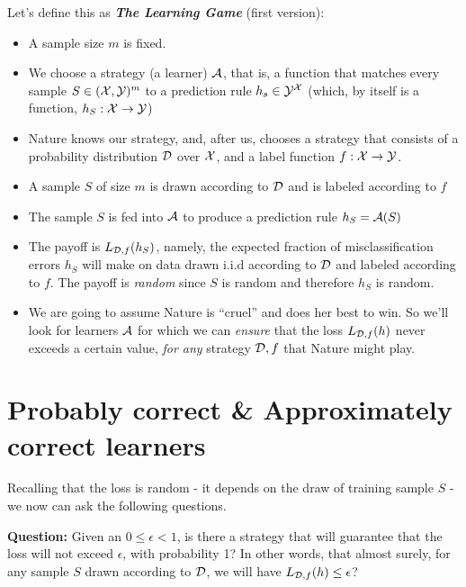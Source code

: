 {\vspace{3mm}
\begin{definition}
Let's define this as \textit{\textbf{ The Learning Game}} (first version):
\begin{itemize}
	\item A sample size $m$ is fixed.
	\item We choose a strategy (a learner) $\mathcal{A}$, that is, a function that matches every sample $S \in (\mathcal{X},\mathcal{Y})^m$ to a prediction rule $h_s \in \mathcal{Y} ^{\mathcal{X}}$ 
	(which, by itself is a function, $h_S:\mathcal{X}\to\mathcal{Y}$) 
	\item Nature knows our strategy, and, after us, chooses a strategy that consists of a probability distribution $\mathcal{D}$ over $\mathcal{X}$, and a label function $f:\mathcal{X}\to\mathcal{Y}$. 
	\item A sample $S$ of size $m$ is drawn according to $\mathcal{D}$ and is labeled
	according to $f$
	\item The sample $S$ is fed into $\mathcal{A}$ to produce a prediction rule
	$h_S=\mathcal{A}(S)$
	\item The payoff is $L_{\mathcal{D},f}(h_S)$, namely, the expected fraction of misclassification errors $h_S$ will make on data drawn i.i.d according to $\mathcal{D}$ and labeled according to $f$.
 The payoff is \textit{random} since $S$ is random and therefore $h_S$ is random.
	\item We are going to assume Nature is ``cruel'' and does her best to win.
	So we'll look for learners $\mathcal{A}$ for which we can \textit{ensure} that the loss $L_{\mathcal{D},f}(h)$ never exceeds a certain value, \textit{for any} strategy $\mathcal{D},f$ that Nature might play.
\end{itemize}
\end{definition}



\section{Probably correct \& Approximately correct learners}

Recalling that the loss is random - it depends on the draw of training sample
$S$ - we now can ask the following questions. 

\vspace{3mm}
{\bf Question:} Given an $0\leq\epsilon<1$, is there a strategy that will guarantee that the loss will not exceed $\epsilon$, with probability 1? In other words, that almost surely, for any sample $S$ drawn according to $\mathcal{D}$, we will have  $L_{\mathcal{D},f}(h) \leq \epsilon$?


}
